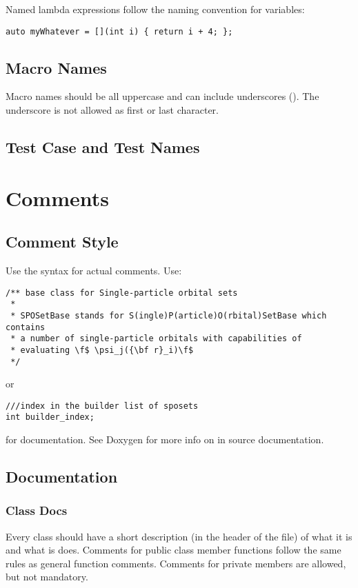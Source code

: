 Named lambda expressions follow the naming convention for variables:

\begin{lstlisting}[showspaces=false]
auto myWhatever = [](int i) { return i + 4; };
\end{lstlisting}

\subsection{Macro Names}

Macro names should be all uppercase and can include underscores (\inlinecode{_}).
The underscore is not allowed as first or last character.

\subsection{Test Case and Test Names}

\section{Comments}

\subsection{Comment Style}

Use the  syntax for actual comments.
Use:
\begin{lstlisting}
/** base class for Single-particle orbital sets
 *
 * SPOSetBase stands for S(ingle)P(article)O(rbital)SetBase which contains
 * a number of single-particle orbitals with capabilities of
 * evaluating \f$ \psi_j({\bf r}_i)\f$
 */
\end{lstlisting}
or
\begin{lstlisting}
///index in the builder list of sposets
int builder_index;
\end{lstlisting}
for documentation. See Doxygen for more info on in source documentation.

\subsection{Documentation}
\subsubsection{Class Docs}
Every class should have a short description (in the header of the file) of what it is and what is does.
Comments for public class member functions follow the same rules as general function comments.
Comments for private members are allowed, but not mandatory.


